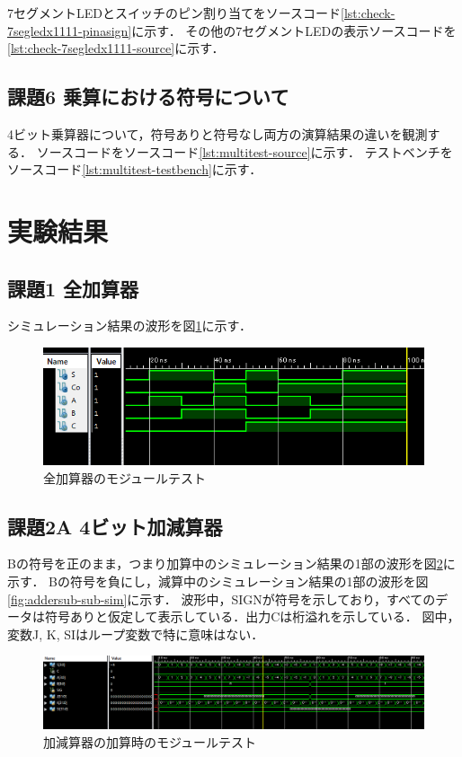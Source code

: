 7セグメントLEDとスイッチのピン割り当てをソースコード\ref{lst:check-7segledx1111-pinasign}に示す．
その他の7セグメントLEDの表示ソースコードを\ref{lst:check-7segledx1111-source}に示す．


\subsection{課題6 乗算における符号について}
4ビット乗算器について，符号ありと符号なし両方の演算結果の違いを観測する．
ソースコードをソースコード\ref{lst:multitest-source}に示す．
テストベンチをソースコード\ref{lst:multitest-testbench}に示す．


\section{実験結果}
\subsection{課題1 全加算器}
シミュレーション結果の波形を図\ref{fig:adder-sim}に示す．

\begin{figure}[tbp]
  \includegraphics[angle=0,width=140mm]{week3/pics/adder-sim.png}
  \centering
  \caption{全加算器のモジュールテスト} %
  \label{fig:adder-sim} %
\end{figure}


\subsection{課題2A 4ビット加減算器}
Bの符号を正のまま，つまり加算中のシミュレーション結果の1部の波形を図\ref{fig:addersub-add-sim}に示す．
Bの符号を負にし，減算中のシミュレーション結果の1部の波形を図\ref{fig:addersub-sub-sim}に示す．
波形中，SIGNが符号を示しており，すべてのデータは符号ありと仮定して表示している．出力Cは桁溢れを示している．
図中，変数J, K, SIはループ変数で特に意味はない．

\begin{figure}[tbp]
  \includegraphics[angle=0,width=160mm]{week3/pics/addersub-add-sim.png}
  \centering
  \caption{加減算器の加算時のモジュールテスト} %
  \label{fig:addersub-add-sim} %
\end{figure}

